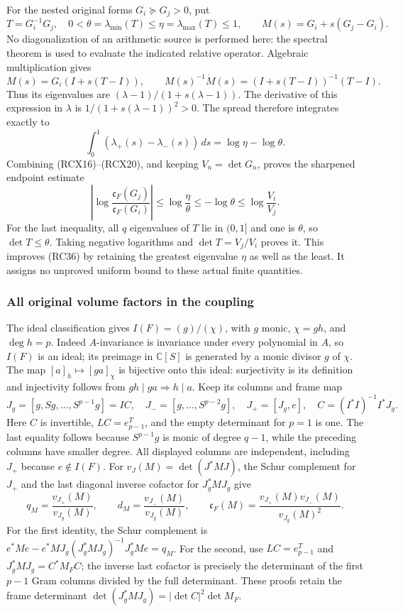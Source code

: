 For the nested original forms \(G_i\succeq G_j>0\), put
\[
 T=G_i^{-1}G_j,\quad
 0<\theta=\lambda_{\min}(T)\le
 \eta=\lambda_{\max}(T)\le1,\qquad
 M(s)=G_i+s(G_j-G_i).
 \tag{RCX18}
\]
No diagonalization of an arithmetic source is performed here:
the spectral theorem is used to evaluate the indicated relative
operator. Algebraic multiplication gives
\[
 M(s)=G_i(I+s(T-I)),\qquad
 M(s)^{-1}\dot M(s)=(I+s(T-I))^{-1}(T-I).
 \tag{RCX19}
\]
Thus its eigenvalues are
\((\lambda-1)/(1+s(\lambda-1))\). The derivative of this expression
in \(\lambda\) is \(1/(1+s(\lambda-1))^2>0\).
The spread therefore integrates exactly to
\[
 \int_0^1(\lambda_+(s)-\lambda_-(s))\,ds
   =\log\eta-\log\theta.
 \tag{RCX20}
\]
Combining (RCX16)--(RCX20), and keeping \(V_n=\det G_n\), proves
the sharpened endpoint estimate
\[
 \boxed{
 \left|\log\frac{\mathfrak c_F(G_j)}{\mathfrak c_F(G_i)}\right|
 \le\log\frac{\eta}{\theta}
 \le-\log\theta
 \le\log\frac{V_i}{V_j}.}
 \tag{RCX21}
\]
For the last inequality, all \(q\) eigenvalues of \(T\) lie in
\((0,1]\) and one is \(\theta\), so
\(\det T\le\theta\). Taking negative logarithms and
\(\det T=V_j/V_i\) proves it. This improves (RC36) by retaining
the greatest eigenvalue \(\eta\) as well as the least. It assigns
no unproved uniform bound to these actual finite quantities.

\subsubsection{All original volume factors in the coupling}

The ideal classification gives \(I(F)=(g)/(\chi)\), with \(g\) monic,
\(\chi=gh\), and \(\deg h=p\). Indeed \(A\)-invariance is invariance
under every polynomial in \(A\), so \(I(F)\) is an ideal; its preimage
in \(\mathbb C[S]\) is generated by a monic divisor \(g\) of \(\chi\).
The map \([a]_h\mapsto[ga]_\chi\) is bijective onto this ideal:
surjectivity is its definition and injectivity follows from
\(gh\mid ga\Rightarrow h\mid a\). Keep its columns and frame map
\[
 J_g=[g,Sg,\ldots,S^{p-1}g]=IC,\quad
 J_-=[g,\ldots,S^{p-2}g],\quad J_+=[J_g,e],\quad
 C=(I^*I)^{-1}I^*J_g.
 \tag{RCX22}
\]
Here \(C\) is invertible, \(LC=e_{p-1}^T\), and the empty
determinant for \(p=1\) is one. The last equality follows because
\(S^{p-1}g\) is monic of degree \(q-1\), while the preceding
columns have smaller degree. All displayed columns are independent,
including \(J_+\) because \(e\notin I(F)\).
For \(v_J(M)=\det(J^*MJ)\), the Schur complement for \(J_+\)
and the last diagonal inverse cofactor for \(J_g^*MJ_g\) give
\[
 q_M=\frac{v_{J_+}(M)}{v_{J_g}(M)},\qquad
 d_M=\frac{v_{J_-}(M)}{v_{J_g}(M)},\qquad
 \mathfrak c_F(M)=
       \frac{v_{J_+}(M)v_{J_-}(M)}{v_{J_g}(M)^2}.
 \tag{RCX23}
\]
For the first identity, the Schur complement is
\(e^*Me-e^*MJ_g(J_g^*MJ_g)^{-1}J_g^*Me=q_M\).
For the second, use \(LC=e_{p-1}^T\) and
\(J_g^*MJ_g=C^*M_FC\); the inverse last cofactor is precisely
the determinant of the first \(p-1\) Gram columns divided by the
full determinant. These proofs retain the frame determinant
\(\det(J_g^*MJ_g)=|\det C|^2\det M_F\).

